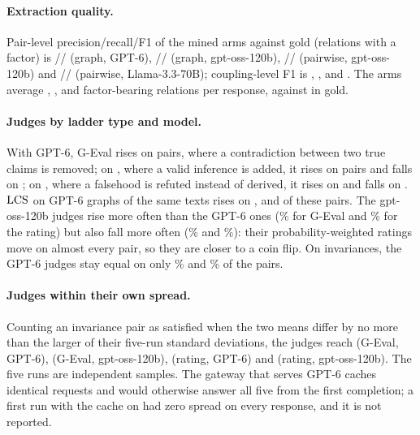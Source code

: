 \paragraph{Extraction quality.} Pair-level precision/recall/F1 of the mined arms against gold
(relations with a factor) is \sThreeGraphGptPairP/\sThreeGraphGptPairR/\sThreeGraphGptPairF{}
(graph, GPT-6), \sThreeGraphOssPairP/\sThreeGraphOssPairR/\sThreeGraphOssPairF{} (graph,
gpt-oss-120b), \sThreePairOssPairP/\sThreePairOssPairR/\sThreePairOssPairF{} (pairwise,
gpt-oss-120b) and \sThreePairLlamaPairP/\sThreePairLlamaPairR/\sThreePairLlamaPairF{} (pairwise,
Llama-3.3-70B); coupling-level F1 is \sThreeGraphGptCoupF, \sThreeGraphOssCoupF, \sThreePairOssCoupF{}
and \sThreePairLlamaCoupF. The arms average \sThreeGraphGptRels, \sThreeGraphOssRels,
\sThreePairOssRels{} and \sThreePairLlamaRels{} factor-bearing relations per response, against
\sThreeGoldRels{} in gold.

\paragraph{Judges by ladder type and model.} With GPT-6, G-Eval rises on \sThreeBGevalGptConflict{}
 pairs, where a contradiction between two true claims is removed; on , where a
valid inference is added, it rises on \sThreeBGevalGptChain{} pairs and falls on
\sThreeBGevalGptChainFalls; on , where a falsehood is refuted instead of derived, it rises on
\sThreeBGevalGptSign{} and falls on \sThreeBGevalGptSignFalls. $\mathrm{LCS}$ on GPT-6 graphs of the same
texts rises on \sThreeGraphGptLamConflict, \sThreeGraphGptLamChain{} and \sThreeGraphGptLamSign{}
of these pairs. The gpt-oss-120b judges rise more often than the GPT-6 ones
(\sThreeBGevalOssIncPct\% for G-Eval and \sThreeBDirectOssIncPct\% for the rating) but also fall
more often (\sThreeBGevalOssIncFallsPct\% and \sThreeBDirectOssIncFallsPct\%): their
probability-weighted ratings move on almost every pair, so they are closer to a coin flip. On
invariances, the GPT-6 judges stay equal on only \sThreeBGevalGptInvPct\% and
\sThreeBDirectGptInvPct\% of the pairs.

\paragraph{Judges within their own spread.} Counting an invariance pair as satisfied when the two
means differ by no more than the larger of their five-run standard deviations, the judges reach
\sThreeBGevalGptInvTol{} (G-Eval, GPT-6), \sThreeBGevalOssInvTol{} (G-Eval, gpt-oss-120b),
\sThreeBDirectGptInvTol{} (rating, GPT-6) and \sThreeBDirectOssInvTol{} (rating, gpt-oss-120b).
The five runs are independent samples. The gateway that serves GPT-6 caches identical requests and
would otherwise answer all five from the first completion; a first run with the cache on had zero
spread on every response, and it is not reported.

